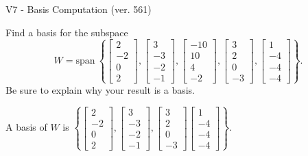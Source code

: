\begin{exercise}
  \begin{exerciseTitle}V7 - Basis Computation (ver. 561)\end{exerciseTitle}
  \begin{exerciseStatement}
    Find a basis for the subspace 
\[W=\mathrm{span}\ \left\{\left[\begin{array}{r}
2 \\
-2 \\
0 \\
2
\end{array}\right] , \left[\begin{array}{r}
3 \\
-3 \\
-2 \\
-1
\end{array}\right] , \left[\begin{array}{r}
-10 \\
10 \\
4 \\
-2
\end{array}\right] , \left[\begin{array}{r}
3 \\
2 \\
0 \\
-3
\end{array}\right] , \left[\begin{array}{r}
1 \\
-4 \\
-4 \\
-4
\end{array}\right]\right\}.\]
 Be sure to explain why your result is a basis.


  \end{exerciseStatement}
  \begin{exerciseAnswer}
   A basis of \(W\) is  \(\left\{\left[\begin{array}{r}
2 \\
-2 \\
0 \\
2
\end{array}\right] , \left[\begin{array}{r}
3 \\
-3 \\
-2 \\
-1
\end{array}\right] , \left[\begin{array}{r}
3 \\
2 \\
0 \\
-3
\end{array}\right] \left[\begin{array}{r}
1 \\
-4 \\
-4 \\
-4
\end{array}\right]\right\}\).
  


  \end{exerciseAnswer}
\end{exercise}